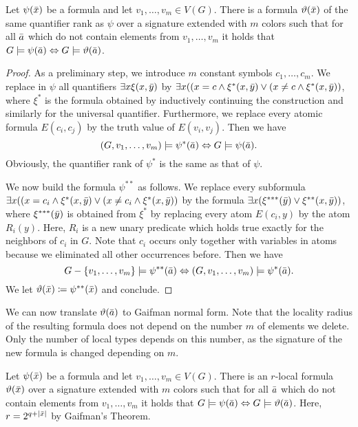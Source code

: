 \begin{lemma}
Let $\psi(\bar{x})$ be a formula and let $v_1,\ldots, v_m\in V(G)$. 
There is a formula $\vartheta(\bar{x})$ 
of the same quantifier rank as $\psi$ over a signature extended 
with $m$ colors such that for all $\bar{a}$ which do not
contain elements from $v_1,\ldots, v_m$ it holds that
$G\models\psi(\bar{a})\Leftrightarrow G\models\vartheta(\bar{a})$. 
\end{lemma}
\begin{proof}
As a preliminary step, we introduce $m$ constant symbols 
$c_1,\ldots, c_m$. We replace in $\psi$ all quantifiers 
$\exists x\xi(x,\bar{y})$ by $\exists x((x=c \wedge \xi^*(x,\bar{y})
\vee (x\neq c\wedge \xi^*(x,\bar{y}))$, 
where $\xi^*$ is the formula obtained by inductively continuing the
construction and similarly for the universal quantifier. Furthermore, 
we replace every atomic formula $E(c_i,c_j)$ by the truth value of
$E(v_i,v_j)$. Then we have
\[(G,v_1,\ldots, v_m)\models\psi^*(\bar{a})\Leftrightarrow G\models\psi(\bar{a}).\]
Obviously, the quantifier rank of $\psi^*$ is the same as that of $\psi$. 

We now build the formula $\psi^{**}$ as follows. We replace
every subformula $\exists x((x=c_i \wedge \xi^*(x,\bar{y}) \vee 
(x\neq c_i \wedge \xi^*(x,\bar{y}))$ by the formula
$\exists x(\xi^{***}(\bar{y}) \vee \xi^{**}(x,\bar{y}))$, 
where $\xi^{***}(\bar{y})$ is obtained from $\xi^{*}$ by
replacing every atom $E(c_i,y)$ by the atom $R_i(y)$. Here, 
$R_i$ is a new unary predicate which holds true exactly for 
the neighbors of $c_i$ in $G$. Note that $c_i$ occurs only together
with variables in atoms because we eliminated all other occurrences
before. Then we have 
\[G-\{v_1,\ldots, v_m\}\models \psi^{**}(\bar{a})
\Leftrightarrow (G,v_1,\ldots, v_m)\models\psi^*(\bar{a}).\]
We let $\vartheta(\bar{x})\coloneqq \psi^{**}(\bar{x})$ and conclude. 
\end{proof}

We can now translate $\vartheta(\bar{a})$ to Gaifman normal form. 
Note that the locality radius of the resulting formula does not depend
on the number $m$ of elements we delete. Only the number of local types
depends on this number, as the signature of the new formula is changed
depending on $m$. 

\begin{theorem}
Let $\psi(\bar{x})$ be a formula and let $v_1,\ldots, v_m\in V(G)$. 
There is an $r$-local formula $\vartheta(\bar{x})$ 
over a signature extended 
with $m$ colors such that for all $\bar{a}$ which do not
contain elements from $v_1,\ldots, v_m$ it holds that
$G\models\psi(\bar{a})\Leftrightarrow G\models\vartheta(\bar{a})$. 
Here, $r=2^{q+|\bar{x}|}$ by Gaifman's Theorem.
\end{theorem}

